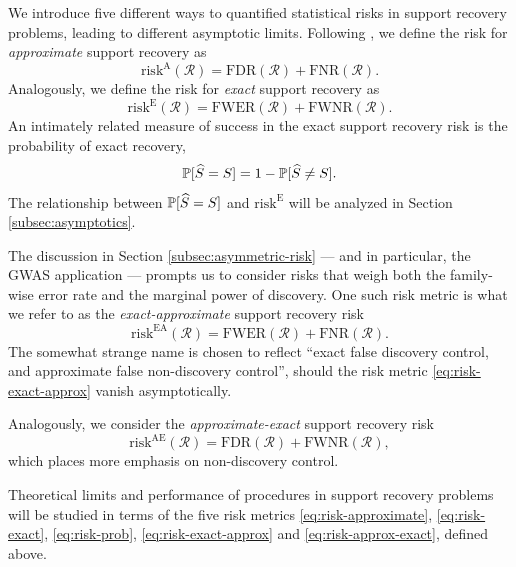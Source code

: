 We introduce five different ways to quantified statistical risks in support recovery problems, leading to different asymptotic limits. 
Following \cite{arias2017distribution}, we define the risk for \emph{approximate} support recovery as
\begin{equation} \label{eq:risk-approximate}
    \mathrm{risk}^{\mathrm{A}}(\mathcal{R}) = \mathrm{FDR}(\mathcal{R}) + \mathrm{FNR}(\mathcal{R}).
\end{equation}
Analogously, we define the risk for \emph{exact} support recovery as
\begin{equation} \label{eq:risk-exact}
    \mathrm{risk}^{\mathrm{E}}(\mathcal{R}) = \mathrm{FWER}(\mathcal{R}) + \mathrm{FWNR}(\mathcal{R}).
\end{equation}
An intimately related measure of success in the exact support recovery risk is the probability of exact recovery, 
\begin{equation} \label{eq:risk-prob}
    \P[\widehat{S} = S] = 1 - \P[\widehat{S} \neq S].
\end{equation}
The relationship between $\P[\widehat{S} = S]$ and $\mathrm{risk}^{\mathrm{E}}$ will be analyzed in Section \ref{subsec:asymptotics}.

The discussion in Section \ref{subsec:asymmetric-risk} --- and in particular, the GWAS application --- prompts us to consider risks that weigh both the family-wise error rate and the marginal power of discovery.
One such risk metric is what we refer to as the \emph{exact-approximate} support recovery risk
\begin{equation} \label{eq:risk-exact-approx}
    \mathrm{risk}^{\mathrm{EA}}(\mathcal{R}) = \mathrm{FWER}(\mathcal{R}) + \mathrm{FNR}(\mathcal{R}).
\end{equation}
The somewhat strange name is chosen to reflect ``exact false discovery control, and approximate false non-discovery control'', should the risk metric \eqref{eq:risk-exact-approx} vanish asymptotically.

Analogously, we consider the \emph{approximate-exact} support recovery risk
\begin{equation} \label{eq:risk-approx-exact}
    \mathrm{risk}^{\mathrm{AE}}(\mathcal{R}) = \mathrm{FDR}(\mathcal{R}) + \mathrm{FWNR}(\mathcal{R}),
\end{equation}
which places more emphasis on non-discovery control.

Theoretical limits and performance of procedures in support recovery problems will be studied in terms of the five risk metrics \eqref{eq:risk-approximate}, \eqref{eq:risk-exact}, \eqref{eq:risk-prob}, \eqref{eq:risk-exact-approx} and \eqref{eq:risk-approx-exact}, defined above.


